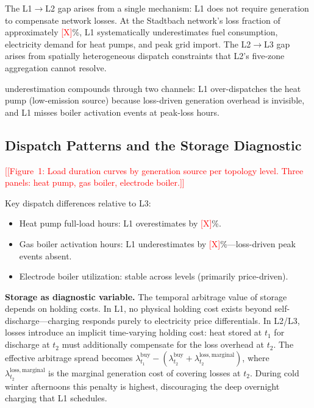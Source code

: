 \documentclass[review,3p]{elsarticle}
\newcommand{\placeholder}[1]{\textcolor{red}{[#1]}}
\begin{document}
The L1$\rightarrow$L2 gap arises from a single mechanism: L1 does not
require generation to compensate network losses. At the Stadtbach
network's loss fraction of approximately \placeholder{X}\%, L1
systematically underestimates fuel consumption, electricity demand for
heat pumps, and peak grid import. The L2$\rightarrow$L3 gap arises
from spatially heterogeneous dispatch constraints that L2's five-zone
aggregation cannot resolve.

 underestimation compounds through two channels: L1
over-dispatches the heat pump (low-emission source) because
loss-driven generation overhead is invisible, and L1 misses boiler
activation events at peak-loss hours.

\subsection{Dispatch Patterns and the Storage Diagnostic}
\label{sec:results_storage}

\placeholder{[Figure~1: Load duration curves by generation source per
topology level. Three panels: heat pump, gas boiler, electrode boiler.]}

Key dispatch differences relative to L3:
\begin{itemize}[nosep]
    \item Heat pump full-load hours: L1 overestimates by
    \placeholder{X}\%.
    \item Gas boiler activation hours: L1 underestimates by
    \placeholder{X}\%---loss-driven peak events absent.
    \item Electrode boiler utilization: stable across levels
    (primarily price-driven).
\end{itemize}

\textbf{Storage as diagnostic variable.} The temporal arbitrage value
of storage depends on holding costs. In L1, no physical holding cost
exists beyond self-discharge---charging responds purely to electricity
price differentials. In L2/L3, losses introduce an implicit
time-varying holding cost: heat stored at $t_1$ for discharge at $t_2$
must additionally compensate for the loss overhead at $t_2$. The
effective arbitrage spread becomes
$\lambda_{t_1}^{\mathrm{buy}} - (\lambda_{t_2}^{\mathrm{buy}} +
\lambda_{t_2}^{\mathrm{loss,marginal}})$, where
$\lambda_{t_2}^{\mathrm{loss,marginal}}$ is the marginal generation
cost of covering losses at $t_2$. During cold winter afternoons this
penalty is highest, discouraging the deep overnight charging that L1
schedules.
\end{document}
